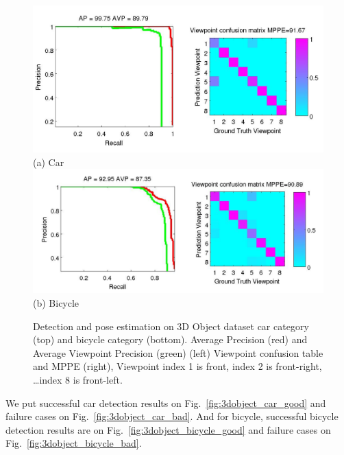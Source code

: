 \documentclass[10pt,twocolumn,letterpaper]{article}
\begin{document}
\begin{figure}[h]
  \centering
  \includegraphics[width=0.99\linewidth]{supp/car_ap_3dobject_tight.png}\\
  \vspace{-5pt}
    (a) Car\\
  \includegraphics[width=0.99\linewidth]{supp/bicycle_ap_3dobject_tight.png}\\
  \vspace{-5pt}
    (b) Bicycle\\
  \caption{Detection and pose estimation on 3D Object dataset car category (top) and bicycle category (bottom).
  Average Precision (red) and Average Viewpoint Precision (green) (left)
  Viewpoint confusion table and MPPE (right), Viewpoint index 1 is front, index 2 is
  front-right, \dots index 8 is front-left. }
  \label{fig:3dobject_ap}
\end{figure}

We put successful car detection results on Fig.~\ref{fig:3dobject_car_good} and
failure cases on Fig.~\ref{fig:3dobject_car_bad}. And for bicycle, successful
bicycle detection results are on Fig.~\ref{fig:3dobject_bicycle_good} and
failure cases on Fig.~\ref{fig:3dobject_bicycle_bad}.
\end{document}
